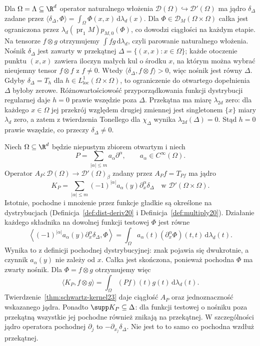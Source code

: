 \begin{przyklad}
\label{ex:diagonal-kernel23}
Dla $\Omega=\Lambda\subseteq\R^d$ operator naturalnego
włożenia $\mathcal D(\Omega)\hookrightarrow\mathcal D'(\Omega)$
ma jądro $\delta_\Delta$ zadane przez
$\langle\delta_\Delta,\Phi\rangle
=\int_\Omega\Phi(x,x)\,\mathrm d\lambda_d(x)$.
Dla $\Phi\in\mathcal D_M(\Omega\times\Omega)$
całka jest ograniczona przez
$\lambda_d(\operatorname{pr}_1 M)p_{M,0}(\Phi)$,
co dowodzi ciągłości na każdym etapie.
Na tensorze $f\otimes g$ otrzymujemy $\int fg\,
\mathrm d\lambda_d$, czyli parowanie naturalnego
włożenia. Nośnik $\delta_\Delta$ jest zawarty
w przekątnej $\Delta=\{(x,x):x\in\Omega\}$;
każde otoczenie punktu $(x,x)$ zawiera iloczyn
małych kul o środku $x$, na którym można wybrać
nieujemny tensor $f\otimes f$ z $f\ne0$.
Wtedy $\langle\delta_\Delta,f\otimes f\rangle>0$,
więc nośnik jest równy $\Delta$.
Gdyby $\delta_\Delta=T_h$ dla
$h\in L^1_{\mathrm{loc}}(\Omega\times\Omega)$,
to ograniczenie do otwartego dopełnienia $\Delta$
byłoby zerowe. Różnowartościowość przyporządkowania
funkcji dystrybucji regularnej daje $h=0$ prawie
wszędzie poza $\Delta$. Przekątna ma miarę
$\lambda_{2d}$ zero: dla każdego $x\in\Omega$ jej
przekrój względem drugiej zmiennej jest singletonem
$\{x\}$ miary $\lambda_d$ zero, a zatem z twierdzenia
Tonellego dla $\chi_\Delta$ wynika
$\lambda_{2d}(\Delta)=0$. Stąd $h=0$ prawie wszędzie,
co przeczy $\delta_\Delta\ne0$.
\end{przyklad}

\begin{przyklad}
\label{ex:dt-kernel-differential}
Niech $\Omega\subseteq\R^d$ będzie niepustym zbiorem
otwartym i niech
\[
 P=\sum_{|\alpha|\le m}a_\alpha\partial^\alpha,
 \qquad a_\alpha\in C^\infty(\Omega).
\]
Operator $A_P:\mathcal D(\Omega)\to\mathcal D'(\Omega)_\beta$
zadany przez $A_P f=T_{Pf}$ ma jądro
\[
 K_P=\sum_{|\alpha|\le m}
 (-1)^{|\alpha|}a_\alpha(y)\partial_x^\alpha\delta_\Delta
 \quad\text{w }\mathcal D'(\Omega\times\Omega).
\]
Istotnie, pochodne i mnożenie przez funkcje gładkie
są określone na dystrybucjach (Definicja~\ref{def:dist-deriv20}
i Definicja~\ref{def:multiply20}). Działanie każdego
składnika na dowolnej funkcji testowej $\Phi$ jest
równe
\[
 \left\langle
 (-1)^{|\alpha|}a_\alpha(y)\partial_x^\alpha\delta_\Delta,
 \Phi\right\rangle
 =\int_\Omega a_\alpha(t)
       (\partial_x^\alpha\Phi)(t,t)\,\mathrm d\lambda_d(t).
\]
Wynika to z definicji pochodnej dystrybucyjnej:
znak pojawia się dwukrotnie, a czynnik $a_\alpha(y)$
nie zależy od $x$. Całka jest skończona, ponieważ
pochodna $\Phi$ ma zwarty nośnik.
Dla $\Phi=f\otimes g$ otrzymujemy więc
\[
 \langle K_P,f\otimes g\rangle
 =\int_\Omega (Pf)(t)g(t)\,\mathrm d\lambda_d(t).
\]
Twierdzenie~\ref{thm:schwartz-kernel23} daje ciągłość
$A_P$ oraz jednoznaczność wskazanego jądra.
Ponadto $\supp K_P\subseteq\Delta$: dla funkcji
testowej o nośniku poza przekątną wszystkie
jej pochodne również znikają na przekątnej.
W szczególności jądro operatora pochodnej
$\partial_j$ to $-\partial_{x_j}\delta_\Delta$.
Nie jest to to samo co pochodna wzdłuż przekątnej.
\end{przyklad}


